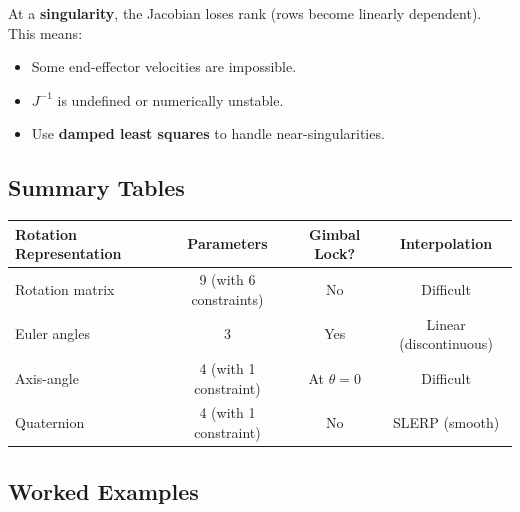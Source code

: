 \begin{tipbox}
At a \textbf{singularity}, the Jacobian loses rank (rows become linearly dependent). This means:
\begin{itemize}
  \item Some end-effector velocities are impossible.
  \item $J^{-1}$ is undefined or numerically unstable.
  \item Use \textbf{damped least squares} to handle near-singularities.
\end{itemize}
\end{tipbox}

\bigseparator

\subsection{Summary Tables}

\begin{center}
\renewcommand{\arraystretch}{1.3}
\begin{tabular}{@{} l c c c @{}}
\toprule
\textbf{Rotation Representation} & \textbf{Parameters} & \textbf{Gimbal Lock?} & \textbf{Interpolation} \\
\midrule
Rotation matrix & 9 (with 6 constraints) & No & Difficult \\
Euler angles & 3 & Yes & Linear (discontinuous) \\
Axis-angle & 4 (with 1 constraint) & At $\theta=0$ & Difficult \\
Quaternion & 4 (with 1 constraint) & No & SLERP (smooth) \\
\bottomrule
\end{tabular}
\end{center}

\bigseparator

\subsection{Worked Examples}


